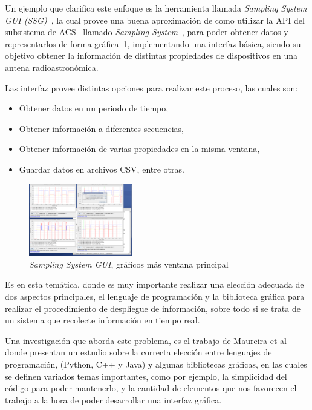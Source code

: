 Un ejemplo que clarifica este enfoque es la herramienta llamada
\emph{Sampling System GUI (SSG)}~\cite{ssg}, la cual provee una buena
aproximación de como utilizar la API del subsistema de ACS~\cite{acs} llamado
\emph{Sampling System}~\cite{acssamp}, para poder obtener datos y
representarlos de forma gráfica~\ref{fig:ssg}, implementando una interfaz básica,
siendo su objetivo obtener la información de distintas propiedades
de dispositivos en una antena radioastronómica.

Las interfaz provee distintas opciones para realizar este proceso,
las cuales son:
\begin{itemize}
    \item Obtener datos en un periodo de tiempo,
    \item Obtener información a diferentes secuencias,
    \item Obtener información de varias propiedades en la misma ventana,
    \item Guardar datos en archivos CSV, entre otras.
\end{itemize}

\begin{figure}[!htb]
    \centering
    \includegraphics[width=0.4\textwidth]{img/ssg}
    \caption{\emph{Sampling System GUI}, gráficos más ventana principal}
    \label{fig:ssg}
\end{figure}

Es en esta temática, donde es muy importante realizar una elección adecuada de
dos aspectos principales, el lenguaje de programación y la biblioteca
gráfica para realizar el procedimiento de despliegue de información,
sobre todo si se trata de un sistema que recolecte información
en tiempo real.

Una investigación que aborda este problema, es el trabajo de Maureira et al~\cite{hpg}
donde presentan un estudio sobre la correcta elección entre lenguajes de programación,
(Python, C++ y Java) y algunas bibliotecas gráficas, en las cuales se definen variados
temas importantes, como por ejemplo, la simplicidad del código para poder mantenerlo,
y la cantidad de elementos que nos favorecen el trabajo a la hora de poder desarrollar
una interfaz gráfica.

